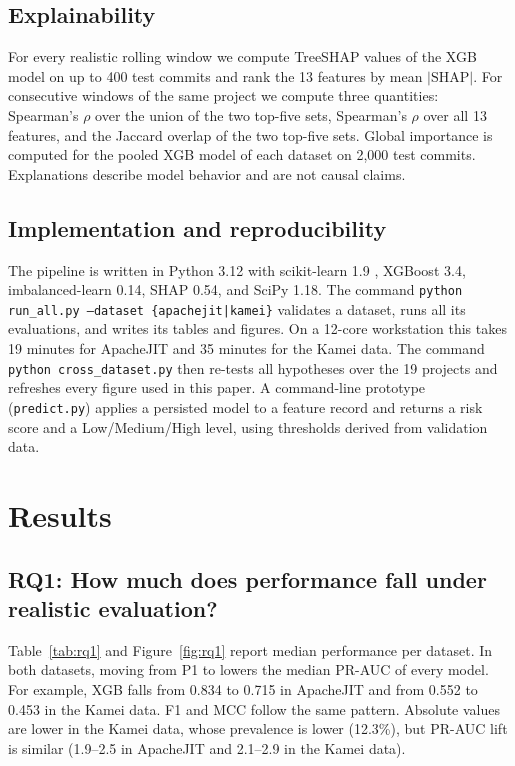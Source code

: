 \subsection{Explainability}\label{sec:shap}

For every realistic rolling window we compute TreeSHAP values \citep{lundberg2017} of the XGB model on up to 400 test commits and rank the 13 features by mean $|\text{SHAP}|$. For consecutive windows of the same project we compute three quantities: Spearman's $\rho$ over the union of the two top-five sets, Spearman's $\rho$ over all 13 features, and the Jaccard overlap of the two top-five sets. Global importance is computed for the pooled \pthree{} XGB model of each dataset on 2{,}000 test commits. Explanations describe model behavior and are not causal claims.

\subsection{Implementation and reproducibility}\label{sec:repro}

The pipeline is written in Python 3.12 with scikit-learn 1.9 \citep{pedregosa2011}, XGBoost 3.4, imbalanced-learn 0.14, SHAP 0.54, and SciPy 1.18. The command \texttt{python run\_all.py --dataset \{apachejit|kamei\}} validates a dataset, runs all its evaluations, and writes its tables and figures. On a 12-core workstation this takes 19 minutes for ApacheJIT and 35 minutes for the Kamei data. The command \texttt{python cross\_dataset.py} then re-tests all hypotheses over the 19 projects and refreshes every figure used in this paper. A command-line prototype (\texttt{predict.py}) applies a persisted model to a feature record and returns a risk score and a Low/Medium/High level, using thresholds derived from validation data.

\section{Results}\label{sec:results}

\subsection{RQ1: How much does performance fall under realistic evaluation?}\label{sec:rq1}

Table~\ref{tab:rq1} and Figure~\ref{fig:rq1} report median performance per dataset. In both datasets, moving from P1 to \pthree{} lowers the median PR-AUC of every model. For example, XGB falls from 0.834 to 0.715 in ApacheJIT and from 0.552 to 0.453 in the Kamei data. F1 and MCC follow the same pattern. Absolute values are lower in the Kamei data, whose prevalence is lower (12.3\%), but PR-AUC lift is similar (1.9--2.5 in ApacheJIT and 2.1--2.9 in the Kamei data).

